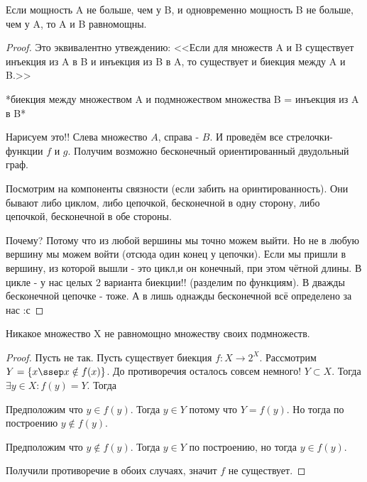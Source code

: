 \begin{theorem} \thmslashn

	Если мощность A не больше, чем у B, и одновременно мощность B не больше, чем у A, то A и B равномощны.
	\begin{proof} \thmslashn
	
		Это эквивалентно утвеждению: <<Если для множеств A и B существует инъекция из A в B и инъекция из B в A, то существует и биекция между A и B.>> 
		
		*биекция между множеством A и подмножеством множества B = инъекция из A в B* 
		
		Нарисуем это!! Слева множество $A$, справа - $B$. И проведём все стрелочки-функции $f$ и $g$. Получим возможно бесконечный ориентированный двудольный граф. 
		
		Посмотрим на компоненты связности (если забить на оринтированность). Они бывают либо циклом, либо цепочкой, бесконечной в одну сторону, либо цепочкой, бесконечной в обе стороны.
		
		Почему? Потому что из любой вершины мы точно можем выйти. Но не в любую вершину мы можем войти (отсюда один конец у цепочки). Если мы пришли в вершину, из которой вышли - это цикл,и он конечный, при этом чётной длины.
		В цикле - у нас целых 2 варианта биекции!! (разделим по функциям). В дважды бесконечной цепочке - тоже. А в лишь однажды бесконечной всё определено за нас :с
	\end{proof}
\end{theorem}


\begin{theorem} \thmslashn

	Никакое множество X не равномощно множеству своих подмножеств.
	\begin{proof} \thmslashn
	
		Пусть не так. Пусть существует биекция $f: X \rightarrow 2^X$. Рассмотрим $Y = \{ x \ssep x \notin f(x) \}$. До противоречия осталось совсем немного! $Y \subset X$. Тогда $\exists y \in X : f(y) = Y$. Тогда
		
        Предположим что $y\in f(y)$. Тогда $y\in Y$ потому что $Y=f(y)$. Но тогда по построению $y \not\in f(y)$.

        Предположим что $y \not\in f(y)$. Тогда $y\in Y$ по построению, но тогда $y\in f(y)$.

	    Получили противоречие в обоих случаях, значит $f$ не существует.
    \end{proof}
\end{theorem}



